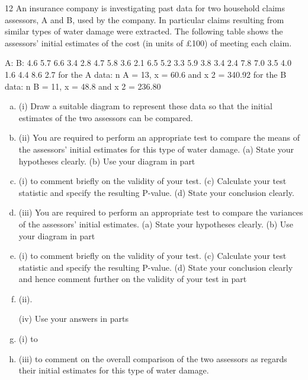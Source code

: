 \documentclass[a4paper,12pt]{article}
\begin{document}
\begin{enumerate}


12
An insurance company is investigating past data for two household claims assessors,
A and B, used by the company. In particular claims resulting from similar types of
water damage were extracted. The following table shows the assessors’ initial
estimates of the cost (in units of £100) of meeting each claim.

A:
B:
4.6
5.7
6.6
3.4
2.8
4.7
5.8
3.6
2.1
6.5
5.2
3.3
5.9
3.8
3.4
2.4
7.8
7.0
3.5
4.0
1.6
4.4
8.6
2.7
for the A data: n A = 13, \sum x = 60.6 and \sum x 2 = 340.92
for the B data: n B = 11, \sum x = 48.8 and \sum x 2 = 236.80
\begin{enumerate}[(a)]
\item (i) Draw a suitable diagram to represent these data so that the initial estimates of
the two assessors can be compared.

\item (ii) You are required to perform an appropriate test to compare the means of the
assessors’ initial estimates for this type of water damage.
(a) State your hypotheses clearly.
(b) Use your diagram in part \item (i) to comment briefly on the validity of your
test.
(c) Calculate your test statistic and specify the resulting P-value.
(d) State your conclusion clearly.
\item (iii)
You are required to perform an appropriate test to compare the variances of
the assessors’ initial estimates.
(a) State your hypotheses clearly.
(b) Use your diagram in part \item (i) to comment briefly on the validity of your
test.
(c) Calculate your test statistic and specify the resulting P-value.
(d) State your conclusion clearly and hence comment further on the validity of your test in part \item (ii).

(iv)
Use your answers in parts \item (i) to \item (iii) to comment on the overall comparison of the two assessors as regards their initial estimates for this type of water damage.
\end{enumerate}



\end{enumerate}
\end{document}
